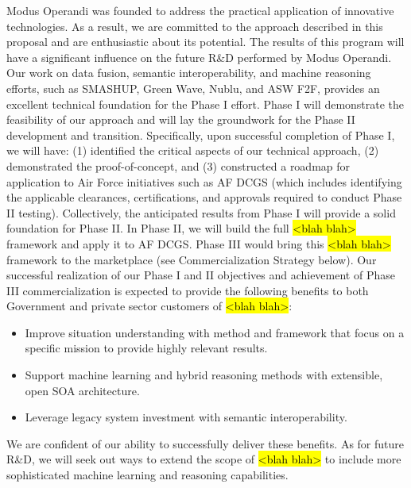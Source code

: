 \documentclass{sbir}
\begin{document}
Modus Operandi was founded to address the practical application of innovative technologies. As a result, we are committed to the approach described in this proposal and are enthusiastic about its potential. The results of this program will have a significant influence on the future R\&D performed by Modus Operandi. Our work on data fusion, semantic interoperability, and machine reasoning efforts, such as SMASHUP, Green Wave, Nublu, and ASW F2F, provides an excellent technical foundation for the Phase I effort. Phase I will demonstrate the feasibility of our approach and will lay the groundwork for the Phase II development and transition. Specifically, upon successful completion of Phase I, we will have: (1) identified the critical aspects of our technical approach, (2) demonstrated the proof-of-concept, and (3) constructed a roadmap for application to Air Force initiatives such as AF DCGS (which includes identifying the applicable clearances, certifications, and approvals required to conduct Phase II testing). Collectively, the anticipated results from Phase I will provide a solid foundation for Phase II. In Phase II, we will build the full \hl{<blah blah>} framework and apply it to AF DCGS. Phase III would bring this \hl{<blah blah>} framework to the marketplace (see Commercialization Strategy below).
Our successful realization of our Phase I and II objectives and achievement of Phase III commercialization is expected to provide the following benefits to both Government and private sector customers of \hl{<blah blah>}:
\begin{itemize}
  \item Improve situation understanding with method and framework that focus on a specific mission to provide highly relevant results.
  \item Support machine learning and hybrid reasoning methods with extensible, open SOA architecture.
  \item Leverage legacy system investment with semantic interoperability.
\end{itemize}
We are confident of our ability to successfully deliver these benefits. As for future R\&D, we will seek out ways to extend the scope of \hl{<blah blah>} to include more sophisticated machine learning and reasoning capabilities.

\label{commercialization}
\end{document}
